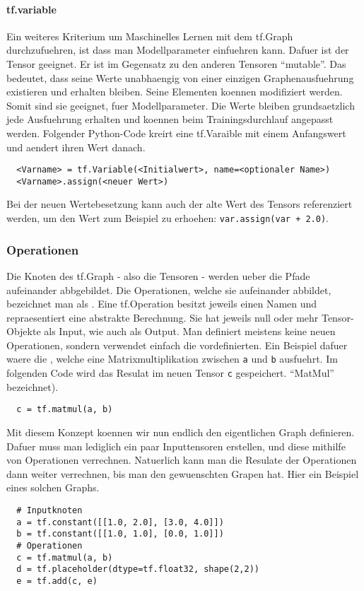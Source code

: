 \paragraph{tf.variable}
Ein weiteres Kriterium um Maschinelles Lernen mit dem tf.Graph durchzufuehren,
ist dass man Modellparameter einfuehren kann. Dafuer ist der
 Tensor geeignet. Er ist im Gegensatz zu den anderen
Tensoren ``mutable''. Das bedeutet, dass seine Werte unabhaengig von einer
einzigen Graphenausfuehrung existieren und erhalten bleiben. Seine Elementen
koennen modifiziert werden. Somit sind sie geeignet, fuer Modellparameter.
Die Werte bleiben grundsaetzlich jede Ausfuehrung erhalten und koennen beim
Trainingsdurchlauf angepasst werden.
\para{}
Folgender Python-Code kreirt eine tf.Varaible mit einem Anfangswert und aendert ihren Wert danach.
\begin{verbatim}
  <Varname> = tf.Variable(<Initialwert>, name=<optionaler Name>)
  <Varname>.assign(<neuer Wert>)
\end{verbatim}
Bei der neuen Wertebesetzung kann auch der alte Wert des Tensors referenziert
werden, um den Wert zum Beispiel zu erhoehen:
\texttt{var.assign(var + 2.0)}.

\subsubsection{Operationen}
Die Knoten des tf.Graph - also die Tensoren - werden ueber die Pfade aufeinander
abbgebildet. Die Operationen, welche sie aufeinander abbildet, bezeichnet man
als . Eine tf.Operation besitzt jeweils einen Namen und repraesentiert eine
abstrakte Berechnung. Sie hat jeweils null oder mehr Tensor-Objekte als
Input, wie auch als Output.
\para{}
Man definiert meistens keine neuen Operationen, sondern verwendet einfach die vordefinierten.
Ein Beispiel dafuer waere die , welche eine
Matrixmultiplikation zwischen \texttt{a} und \texttt{b}
ausfuehrt. Im folgenden Code wird das Resulat im neuen Tensor
\texttt{c} gespeichert.
``MatMul'' bezeichnet).
\begin{verbatim}
  c = tf.matmul(a, b)
\end{verbatim}
\para{}
Mit diesem Konzept koennen wir nun endlich den eigentlichen Graph definieren.
Dafuer muss man lediglich ein paar Inputtensoren erstellen, und diese mithilfe
von Operationen verrechnen. Natuerlich kann man die Resulate der Operationen
dann weiter verrechnen, bis man den gewuenschten Grapen hat.
\para{}
Hier ein Beispiel eines solchen Graphs.
\begin{verbatim}
  # Inputknoten
  a = tf.constant([[1.0, 2.0], [3.0, 4.0]])
  b = tf.constant([[1.0, 1.0], [0.0, 1.0]])
  # Operationen
  c = tf.matmul(a, b)
  d = tf.placeholder(dtype=tf.float32, shape(2,2))
  e = tf.add(c, e)
\end{verbatim}

